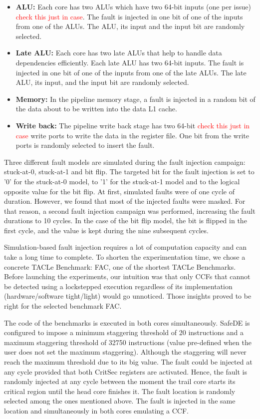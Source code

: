 \begin{itemize}
    \item \textbf{ALU:} Each core has two ALUs which have two 64-bit inputs (one per issue) \textcolor{red}{check this just in case}. The fault is injected in one bit of one of the inputs from one of the ALUs. The ALU, its input and the input bit are randomly selected. 
    \item \textbf{Late ALU:} Each core has two late ALUs that help to handle data dependencies efficiently. Each late ALU has two 64-bit inputs. The fault is injected in one bit of one of the inputs from one of the late ALUs. The late ALU, its input, and the input bit are randomly selected.
    \item \textbf{Memory:} In the pipeline memory stage, a fault is injected in a random bit of the data about to be written into the data L1 cache.
    \item \textbf{Write back:} The pipeline write back stage has two 64-bit \textcolor{red}{check this just in case} write ports to write the data in the register file. One bit from the write ports is randomly selected to insert the fault.
\end{itemize}

Three different fault models are simulated during the fault injection campaign: stuck-at-0, stuck-at-1 and bit flip. The targeted bit for the fault injection is set to '0' for the stuck-at-0 model, to '1' for the stuck-at-1 model and to the logical opposite value for the bit flip. At first, simulated faults were of one cycle of duration. However, we found that most of the injected faults were masked. For that reason, a second fault injection campaign was performed, increasing the fault durations to 10 cycles. In the case of the bit flip model, the bit is flipped in the first cycle, and the value is kept during the nine subsequent cycles.

Simulation-based fault injection requires a lot of computation capacity and can take a long time to complete. To shorten the experimentation time, we chose a concrete TACLe Benchmark: FAC, one of the shortest TACLe Benchmarks. Before launching the experiments, our intuition was that only CCFs that cannot be detected using a lockstepped execution regardless of its implementation (hardware/software tight/light) would go unnoticed. Those insights proved to be right for the selected benchmark FAC.

The code of the benchmarks is executed in both cores simultaneously. SafeDE is configured to impose a minimum staggering threshold of 20 instructions and a maximum staggering threshold of 32750 instructions (value pre-defined when the user does not set the maximum staggering). Although the staggering will never reach the maximum threshold due to its big value. The fault could be injected at any cycle provided that both CritSec registers are activated. Hence, the fault is randomly injected at any cycle between the moment the trail core starts its critical region until the head core finishes it. The fault location is randomly selected among the ones mentioned above. The fault is injected in the same location and simultaneously in both cores emulating a CCF.

